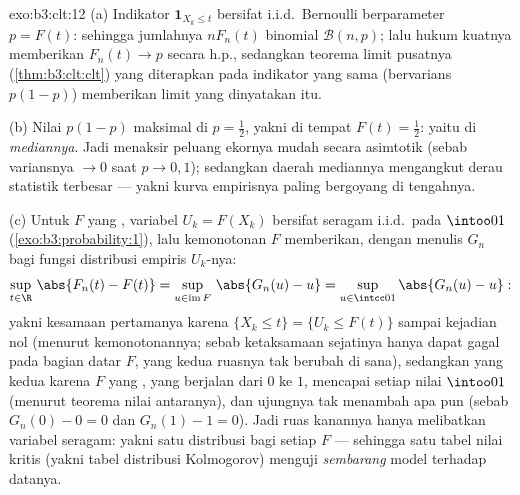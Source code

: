 \begin{solution}{exo:b3:clt:12}
(a) Indikator $\mathbf 1_{X_k \leq t}$ bersifat i.i.d.\
Bernoulli berparameter $p = F(t)$: sehingga jumlahnya $nF_n(t)$
binomial $\mathcal B(n, p)$; lalu hukum kuatnya memberikan $F_n(t)
\to p$ secara h.p., sedangkan teorema limit pusatnya (\cref{thm:b3:clt:clt}) yang diterapkan pada
indikator yang sama (bervarians $p(1-p)$) memberikan limit
 yang dinyatakan itu.

(b) Nilai $p(1 - p)$ maksimal di $p = \frac12$, yakni di tempat
$F(t) = \frac12$: yaitu di \emph{mediannya}. Jadi menaksir peluang
ekornya mudah secara asimtotik (sebab variansnya $\to 0$ saat
$p \to 0, 1$); sedangkan daerah mediannya mengangkut derau
statistik terbesar --- yakni kurva empirisnya paling bergoyang di
tengahnya.

(c) Untuk $F$ yang , variabel $U_k = F(X_k)$ bersifat
seragam i.i.d.\ pada $\intoo01$ (\cref{exo:b3:probability:1}),
lalu kemonotonan $F$ memberikan, dengan menulis $G_n$ bagi
fungsi distribusi empiris $U_k$-nya:
\[
\sup_{t\in\R}\,\abs{F_n(t) - F(t)}
= \sup_{u \in \operatorname{im}F}\,\abs{G_n(u) - u}
= \sup_{u\in\intcc01}\abs{G_n(u) - u} :
\]
yakni kesamaan pertamanya karena $\{X_k \leq t\} = \{U_k \leq
F(t)\}$ sampai kejadian nol (menurut kemonotonannya; sebab ketaksamaan sejatinya
hanya dapat gagal pada bagian datar $F$, yang kedua ruasnya
tak berubah di sana), sedangkan yang kedua karena $F$ yang ,
yang berjalan dari $0$ ke $1$, mencapai setiap nilai
$\intoo01$ (menurut teorema nilai antaranya), dan ujungnya
tak menambah apa pun (sebab $G_n(0) - 0 = 0$ dan $G_n(1) - 1 = 0$). Jadi
ruas kanannya hanya melibatkan variabel seragam: yakni satu distribusi
bagi setiap $F$ --- sehingga satu tabel nilai kritis (yakni tabel
distribusi Kolmogorov) menguji \emph{sembarang} model 
terhadap datanya.
\end{solution}

